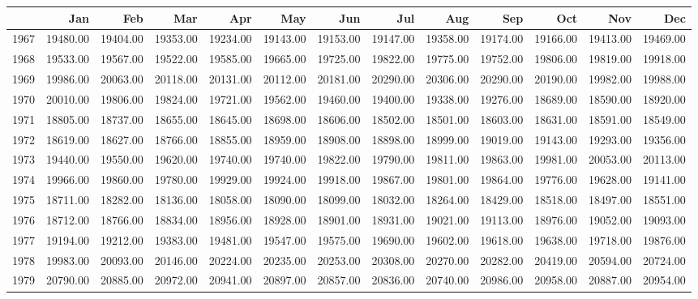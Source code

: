 \begin{longtable}{rrrrrrrrrrrrr}
  \hline
 & Jan & Feb & Mar & Apr & May & Jun & Jul & Aug & Sep & Oct & Nov & Dec \\ 
  \hline
1967 & 19480.00 & 19404.00 & 19353.00 & 19234.00 & 19143.00 & 19153.00 & 19147.00 & 19358.00 & 19174.00 & 19166.00 & 19413.00 & 19469.00 \\ 
  1968 & 19533.00 & 19567.00 & 19522.00 & 19585.00 & 19665.00 & 19725.00 & 19822.00 & 19775.00 & 19752.00 & 19806.00 & 19819.00 & 19918.00 \\ 
  1969 & 19986.00 & 20063.00 & 20118.00 & 20131.00 & 20112.00 & 20181.00 & 20290.00 & 20306.00 & 20290.00 & 20190.00 & 19982.00 & 19988.00 \\ 
  1970 & 20010.00 & 19806.00 & 19824.00 & 19721.00 & 19562.00 & 19460.00 & 19400.00 & 19338.00 & 19276.00 & 18689.00 & 18590.00 & 18920.00 \\ 
  1971 & 18805.00 & 18737.00 & 18655.00 & 18645.00 & 18698.00 & 18606.00 & 18502.00 & 18501.00 & 18603.00 & 18631.00 & 18591.00 & 18549.00 \\ 
  1972 & 18619.00 & 18627.00 & 18766.00 & 18855.00 & 18959.00 & 18908.00 & 18898.00 & 18999.00 & 19019.00 & 19143.00 & 19293.00 & 19356.00 \\ 
  1973 & 19440.00 & 19550.00 & 19620.00 & 19740.00 & 19740.00 & 19822.00 & 19790.00 & 19811.00 & 19863.00 & 19981.00 & 20053.00 & 20113.00 \\ 
  1974 & 19966.00 & 19860.00 & 19780.00 & 19929.00 & 19924.00 & 19918.00 & 19867.00 & 19801.00 & 19864.00 & 19776.00 & 19628.00 & 19141.00 \\ 
  1975 & 18711.00 & 18282.00 & 18136.00 & 18058.00 & 18090.00 & 18099.00 & 18032.00 & 18264.00 & 18429.00 & 18518.00 & 18497.00 & 18551.00 \\ 
  1976 & 18712.00 & 18766.00 & 18834.00 & 18956.00 & 18928.00 & 18901.00 & 18931.00 & 19021.00 & 19113.00 & 18976.00 & 19052.00 & 19093.00 \\ 
  1977 & 19194.00 & 19212.00 & 19383.00 & 19481.00 & 19547.00 & 19575.00 & 19690.00 & 19602.00 & 19618.00 & 19638.00 & 19718.00 & 19876.00 \\ 
  1978 & 19983.00 & 20093.00 & 20146.00 & 20224.00 & 20235.00 & 20253.00 & 20308.00 & 20270.00 & 20282.00 & 20419.00 & 20594.00 & 20724.00 \\ 
  1979 & 20790.00 & 20885.00 & 20972.00 & 20941.00 & 20897.00 & 20857.00 & 20836.00 & 20740.00 & 20986.00 & 20958.00 & 20887.00 & 20954.00 \\ 

\end{longtable}
